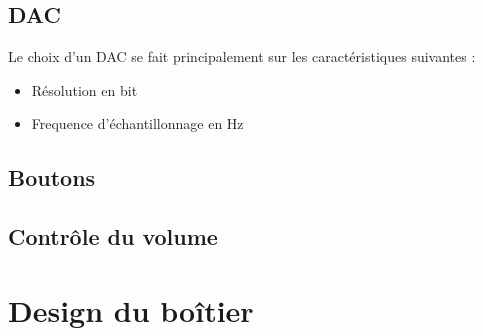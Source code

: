 \subsection{DAC}
Le choix d'un DAC se fait principalement sur les caractéristiques suivantes :

\begin{itemize}
    \item Résolution en bit
    \item Frequence d'échantillonnage en Hz
\end{itemize}

\subsection{Boutons}

\subsection{Contrôle du volume}

\clearpage
\section{Design du boîtier}